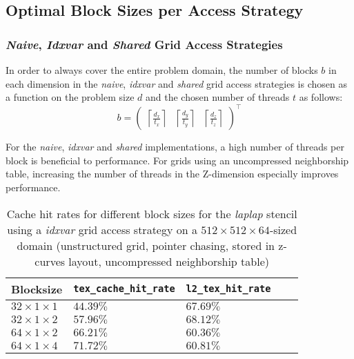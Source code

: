 \subsection{Optimal Block Sizes per Access Strategy}

\subsubsection{\emph{Naive}, \emph{Idxvar} and \emph{Shared} Grid Access Strategies}
In order to always cover the entire problem domain, the number of blocks $b$ in each dimension in the \emph{naive}, \emph{idxvar} and \emph{shared} grid access strategies is chosen as a function on the problem size $d$ and the chosen number of threads $t$ as follows:
$$b = \begin{pmatrix}\left\lceil\frac{d_x}{t_x}\right\rceil & \left\lceil\frac{d_y}{t_y}\right\rceil & \left\lceil\frac{d_z}{t_z}\right\rceil\end{pmatrix}^\top$$

For the \emph{naive}, \emph{idxvar} and \emph{shared} implementations, a high number of threads per block is beneficial to performance. For grids using an uncompressed neighborship table, increasing the number of threads in the Z-dimension especially improves performance.

\begin{table}
	\begin{tabular}{l l l p{2cm} p{2cm}}
		\hline
		\textbf{Blocksize} & \textbf{\texttt{tex\_\allowbreak cache\_\allowbreak hit\_\allowbreak rate}} & \textbf{\texttt{l2\_\allowbreak tex\_\allowbreak hit\_\allowbreak rate}} \\
		\hline
		\hline
		$32\times 1\times 1$ & $44.39\%$ & $67.69\%$ \\
		$32\times 1\times 2$ & $57.96\%$ & $68.12\%$ \\
		$64\times 1\times 2$ & $66.21\%$ & $60.36\%$ \\
		$64\times 1\times 4$ & $71.72\%$ & $60.81\%$ \\
		\hline
	\end{tabular}
	\caption{\label{tab:laplap-blocksize-metrics} Cache hit rates for different block sizes for the \emph{laplap} stencil using a \emph{idxvar} grid access strategy on a $512\times 512\times 64$-sized domain (unstructured grid, pointer chasing, stored in z-curves layout, uncompressed neighborship table)}
\end{table}

